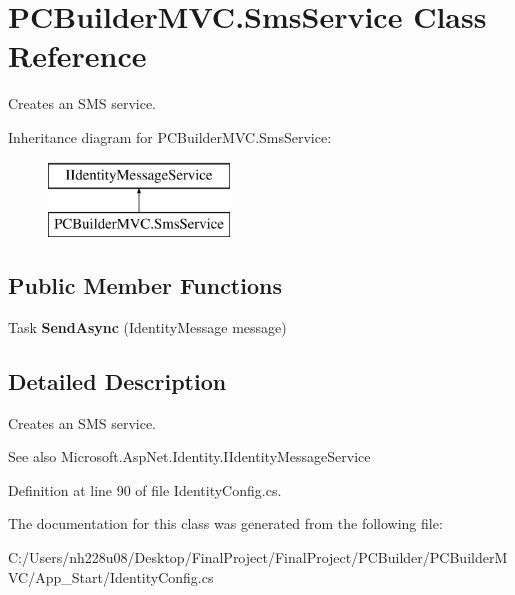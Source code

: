 \hypertarget{class_p_c_builder_m_v_c_1_1_sms_service}{}\section{P\+C\+Builder\+M\+V\+C.\+Sms\+Service Class Reference}
\label{class_p_c_builder_m_v_c_1_1_sms_service}


Creates an S\+MS service.  


Inheritance diagram for P\+C\+Builder\+M\+V\+C.\+Sms\+Service\+:\begin{figure}[H]
\begin{center}
\leavevmode
\includegraphics[height=2.000000cm]{class_p_c_builder_m_v_c_1_1_sms_service}
\end{center}
\end{figure}
\subsection*{Public Member Functions}
\begin{DoxyCompactItemize}
\item 
Task {\bfseries Send\+Async} (Identity\+Message message)\hypertarget{class_p_c_builder_m_v_c_1_1_sms_service_afebab35ad2f0bab84e2786ab713907bc}{}\label{class_p_c_builder_m_v_c_1_1_sms_service_afebab35ad2f0bab84e2786ab713907bc}

\end{DoxyCompactItemize}


\subsection{Detailed Description}
Creates an S\+MS service. 

\begin{DoxySeeAlso}{See also}
Microsoft.\+Asp\+Net.\+Identity.\+I\+Identity\+Message\+Service


\end{DoxySeeAlso}


Definition at line 90 of file Identity\+Config.\+cs.



The documentation for this class was generated from the following file\+:\begin{DoxyCompactItemize}
\item 
C\+:/\+Users/nh228u08/\+Desktop/\+Final\+Project/\+Final\+Project/\+P\+C\+Builder/\+P\+C\+Builder\+M\+V\+C/\+App\+\_\+\+Start/Identity\+Config.\+cs\end{DoxyCompactItemize}
